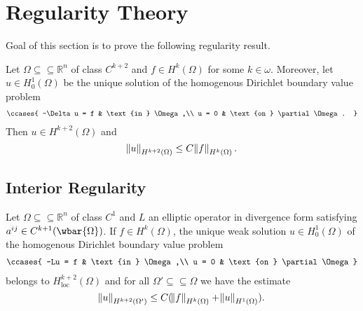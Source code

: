 \section*{Regularity Theory}

Goal of this section is to prove the following regularity result.

\begin{theorem}
	\label{thm:regularity}
	Let $\Omega \subseteq \subseteq \mathbb{R}^n$ of class $C^{k + 2}$ and $f \in H^k(\Omega)$ for some $k \in \omega$. Moreover, let $u \in H^1_0(\Omega)$ be the unique solution of the homogenous Dirichlet boundary value problem
	\begin{align*}
		\ccases{
			-\Delta u = f & \text{in } \Omega,\\
			u = 0 & \text{on } \partial \Omega.
		}
	\end{align*}
	Then $u \in H^{k + 2}(\Omega)$ and 
	\begin{equation*}
		\norm{u}_{H^{k + 2}(\Omega)} \leq C\norm{f}_{H^k(\Omega)}.
	\end{equation*}
\end{theorem}

\subsection*{Interior Regularity}

\begin{theorem}
	Let $\Omega \subseteq \subseteq \mathbb{R}^n$ of class $C^1$ and $L$ an elliptic operator in divergence form satisfying $a^{ij} \in C^{k + 1}(\wbar{\Omega})$. If $f \in H^k(\Omega)$, the unique weak solution $u \in H^1_0(\Omega)$ of the homogenous Dirichlet boundary value problem
	\begin{align*}
		\ccases{
			-Lu = f & \text{in } \Omega,\\
			u = 0 & \text{on } \partial\Omega
		}
	\end{align*}
	\noindent belongs to $H^{k + 2}_{\mathrm{loc}}(\Omega)$ and for all $\Omega' \subseteq \subseteq \Omega$ we have the estimate
	\begin{equation*}
		\norm{u}_{H^{k + 2}(\Omega')} \leq C(\norm{f}_{H^k(\Omega)} + \norm{u}_{H^1(\Omega)}).
	\end{equation*}
\end{theorem}

